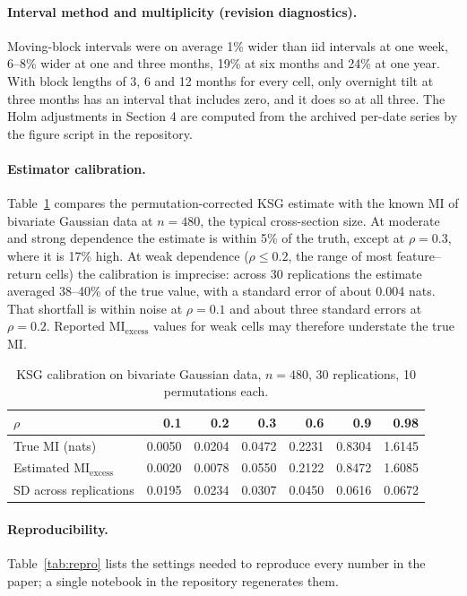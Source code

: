 \documentclass[11pt]{article}
\newcommand{\miex}{\mathrm{MI}_{\mathrm{excess}}}
\begin{document}
\paragraph{Interval method and multiplicity (revision diagnostics).} Moving-block
intervals were on average 1\% wider than iid intervals at one week, 6--8\% wider at
one and three months, 19\% at six months and 24\% at one year. With block lengths of
3, 6 and 12 months for every cell, only overnight tilt at three months has an interval
that includes zero, and it does so at all three. The Holm adjustments in Section 4 are
computed from the archived per-date series by the figure script in the repository.

\paragraph{Estimator calibration.} Table~\ref{tab:cal} compares the
permutation-corrected KSG estimate with the known MI of bivariate Gaussian data at
$n=480$, the typical cross-section size. At moderate and strong dependence the estimate
is within 5\% of the truth, except at $\rho=0.3$, where it is 17\% high. At weak
dependence ($\rho\le0.2$, the range of most feature--return cells) the calibration is
imprecise: across 30 replications the estimate averaged 38--40\% of the true value,
with a standard error of about 0.004 nats. That shortfall is within noise at
$\rho=0.1$ and about three standard errors at $\rho=0.2$. Reported $\miex$ values for
weak cells may therefore understate the true MI.

\begin{table}[h]
\centering\small
\caption{KSG calibration on bivariate Gaussian data, $n=480$, 30 replications, 10
permutations each.}
\label{tab:cal}
\begin{tabular}{lrrrrrr}
\toprule
$\rho$ & 0.1 & 0.2 & 0.3 & 0.6 & 0.9 & 0.98 \\
\midrule
True MI (nats) & 0.0050 & 0.0204 & 0.0472 & 0.2231 & 0.8304 & 1.6145 \\
Estimated $\miex$ & 0.0020 & 0.0078 & 0.0550 & 0.2122 & 0.8472 & 1.6085 \\
SD across replications & 0.0195 & 0.0234 & 0.0307 & 0.0450 & 0.0616 & 0.0672 \\
\bottomrule
\end{tabular}
\end{table}

\paragraph{Reproducibility.} Table~\ref{tab:repro} lists the settings needed to
reproduce every number in the paper; a single notebook in the repository regenerates
them.
\end{document}
